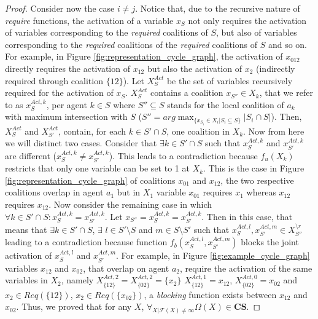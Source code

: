 \documentclass{aamas2012}
\begin{document}
\begin{proof}
Consider now the case $i\neq j$.  Notice that, due to the recursive nature of
\emph{require} functions, the activation of a variable $x_S$ not only requires the activation of
variables corresponding to the \emph{required} coalitions of $S$, but also of
variables corresponding to the \emph{required} coalitions of the \emph{required}
coalitions of $S$ and so on. For example, in Figure
\ref{fig:representation_cycle_graph}, the activation of $x_{012}$ directly requires the activation of $x_{12}$ but also the
activation of $x_2$ (indirectly required through coalition $\{12\}$).
Let $X^{Act}_S$ be the set of variables recursively required for the activation
of $x_S$. $X^{Act}_S$ contains a coalition $x_{S''}\in X_k$, that we refer to as
$x^{Act,k}_S$, per agent $k\in S$ where $S''\subseteq S$ stands for the local
coalition of $a_k$ with maximum intersection with $S$ ($S'' = arg \max_{\{x_{S_i}\in X_i \vert S_i \subseteq
S\}} \vert S_i\cap S\vert$). Then, $X^{Act}_S$ and $X^{Act}_{S'}$, contain, for
each $k\in S'\cap S$, one coalition in $X_k$. Now from here we will distinct two
cases. Consider that $\exists k\in S'\cap S$ such that $x^{Act,k}_S$
and $x^{Act,k}_{S'}$ are different
($x^{Act,k}_{S}\neq x^{Act,k}_{S'}$). This leads to a contradiction because $f_u(X_k)$
restricts that only one variable can be set to 1 at $X_k$. This is the case in
Figure \ref{fig:representation_cycle_graph} of coalitions $x_{01}$ and $x_{12}$,
the two respective coalitions overlap in agent $a_1$ but in $X_1$ variable
$x_{01}$ requires $x_{1}$ whereas $x_{12}$ requires $x_{12}$. Now consider the
remaining case in which $\forall k\in S'\cap S : x^{Act,k}_S=x^{Act,k}_{S'}$. 
Let $x_{S''}=x^{Act,k}_S=x^{Act,k}_{S'}$. Then in this case, that
means that $\exists k\in S'\cap S$, $\exists$ $l\in S'\setminus S$ and $m \in S \setminus S'$ such that
$x^{Act,l}_S,x^{Act,m}_{S'} \in X^{\setminus r}_{S''}$ leading to a contradiction because function
$f_b(x^{Act,l}_S,x^{Act,m}_{S'})$ blocks the joint activation of $x^{Act,l}_S$
and $x^{Act,m}_{S'}$. For example, in Figure \ref{fig:example_cycle_graph}
variables $x_{12}$ and $x_{02}$, that overlap on agent $a_2$, require the
activation of the same variables in $X_2$, namely $X^{Act,2}_{\{12\}} =
X^{Act,2}_{\{02\}} = \{x_{2}\}$
$X^{Act,1}_{\{12\}}=x_{12}$, $X^{Act,0}_{\{02\}}=x_{02}$ and $x_2\in Req(\{12\})$, $x_2\in
Req(\{x_{02}\})$, a \emph{blocking} function exists between $x_{12}$ and $x_{02}$.
Thus, we proved that for any $X$, $\forall_{X \vert \mathcal{F}(X)\neq \infty}
\Omega(X)\in \mathbf{CS}$.


\end{proof}
\end{document}
